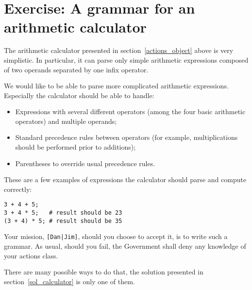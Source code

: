 \section{Exercise: A grammar for an arithmetic calculator}
\label{calculator}

The arithmetic calculator presented in section~\ref{actions_object} 
above is very simplistic. In particular, it can parse only 
simple arithmetic expressions composed of two operands separated 
by one infix operator.

We would like to be able to parse more complicated arithmetic 
expressions. Especially the calculator should be able to handle:
\begin{itemize}
\item Expressions with several different operators (among the four 
basic arithmetic operators) and multiple operands;
\item Standard precedence rules between operators (for example,
multiplications should be performed prior to additions);
\item Parentheses to override usual precedence rules.
\end{itemize}

These are a few examples of expressions the calculator should 
parse and compute correctly:
\begin{verbatim}
3 + 4 + 5;
3 + 4 * 5;   # result should be 23
(3 + 4) * 5; # result should be 35 
\end{verbatim}

\begin{exercise}
Your mission, \verb'[Dan|Jim]', should you choose to accept it, 
is to write such a grammar. As usual, should you fail, the 
Government shall deny any knowledge of your actions class.

There are many possible ways to do that, the solution presented 
in section~\ref{sol_calculator} is only one of them.
\end{exercise}

